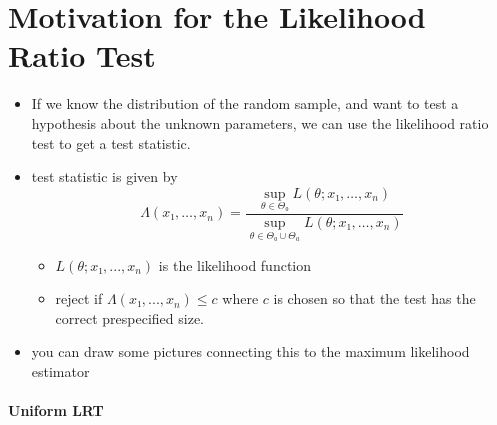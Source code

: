 

\part*{Motivation for the Likelihood Ratio Test}%

\begin{itemize}
\item If we know the distribution of the random sample, and want to
  test a hypothesis about the unknown parameters, we can use the
  likelihood ratio test to get a test statistic.
\item test statistic is given by
  \begin{equation*}
    Λ(x₁,…,x_n) =
    \frac{\sup_{θ ∈ Θ₀} L(θ; x₁,…,x_n)}{\sup_{θ ∈ Θ₀ ∪ Θ_a} L(θ; x₁,…,x_n)}
  \end{equation*}
\begin{itemize}
\item $L(θ; x₁,...,x_n)$ is the likelihood function
\item reject if $Λ(x₁,...,x_n) ≤ c$ where $c$ is chosen
        so that the test has the correct prespecified size.
\end{itemize}
\item you can draw some pictures connecting this to the maximum
      likelihood estimator
\end{itemize}

\subsection{Uniform LRT}

